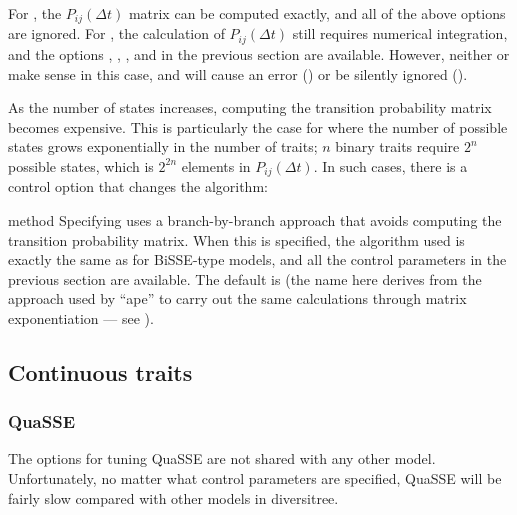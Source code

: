 \documentclass[12pt,twoside]{article}
\newenvironment{cdescription}{\begin{description}[font=\tt,leftmargin=4em,labelindent=2em,noitemsep]\addtolength{\parskip}{.75ex}}{\end{description}}
\newcommand{\dt}{\ensuremath{\Delta t}}
\begin{document}
For , the $P_{ij}(\dt)$ matrix can be computed exactly, and
all of the above  options are ignored.
%
For , the calculation of $P_{ij}(\dt)$ still requires
numerical integration, and the options , ,
, and  in the previous section are available.
However, neither  or  make sense in
this case, and will cause an error () or be
silently ignored ().

As the number of states increases, computing the transition
probability matrix becomes expensive.  This is particularly the case
for  where the number of possible states
grows exponentially in the number of traits; $n$ binary traits require
$2^n$ possible states, which is $2^{2n}$ elements in $P_{ij}(\dt)$.
%
In such cases, there is a control option that changes the algorithm:
\begin{cdescription}
\item[method] Specifying  uses a branch-by-branch
  approach that avoids computing the transition probability matrix.
  When this is specified, the algorithm used is exactly the same as
  for BiSSE-type models, and all the control parameters in the
  previous section are available.  The default is 
  (the name here derives from the approach used by ``ape'' to carry
  out the same calculations through matrix exponentiation --- see
  \citealp{Moler-2003-3}).
\end{cdescription}

\subsection{Continuous traits}

\subsubsection{QuaSSE}
The options for tuning QuaSSE are not shared with any other model.
Unfortunately, no matter what control parameters are specified, QuaSSE
will be fairly slow compared with other models in diversitree.
\end{document}
